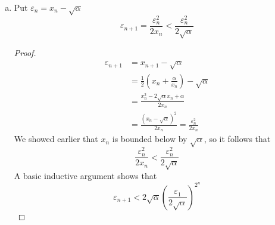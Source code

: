 \documentclass{article}
\begin{document}
\begin{enumerate}
\begin{enumerate}[a.]
\item Put $\varepsilon_n = x_n - \sqrt{\alpha}$
\claim \begin{equation*}
\varepsilon_{n+1} = \frac{\varepsilon_n^2}{2x_n}
                  < \frac{\varepsilon_n^2}{2\sqrt{\alpha}}
\end{equation*}
\begin{proof}
\begin{equation*}
\begin{split}
\varepsilon_{n+1} &= x_{n+1} - \sqrt{\alpha} \\
                  &= \frac{1}{2}\left(x_n + \frac{\alpha}{x_n}\right)
                   - \sqrt{\alpha} \\
                  &= \frac{x_n^2 - 2\sqrt{\alpha}x_n + \alpha}{2x_n} \\
                  &= \frac{(x_n-\sqrt{\alpha})^2}{2x_n}
                   = \frac{\varepsilon_n^2}{2x_n}
\end{split}
\end{equation*}
We showed earlier that $x_n$ is bounded below by $\sqrt{\alpha}$, so it follows
that
\begin{equation*}
\frac{\varepsilon_n^2}{2x_n} < \frac{\varepsilon_n^2}{2\sqrt{\alpha}}
\end{equation*}
A basic inductive argument shows that
\begin{equation*}
\varepsilon_{n+1} < 2\sqrt{\alpha}\left(
                        \frac{\varepsilon_1}{2\sqrt{\alpha}}
                    \right)^{2^n}
\end{equation*}
\end{proof}
\end{enumerate}
\end{enumerate}
\end{document}
